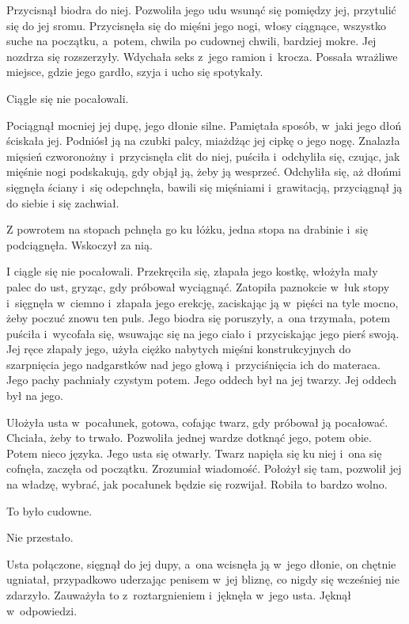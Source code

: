 \documentclass[oneside,polish,11pt,sfheadings]{mwbk}
\begin{document}
Przycisnął biodra do niej. Pozwoliła jego udu wsunąć się pomiędzy jej,
przytulić się do jej sromu. Przycisnęła się do mięśni jego nogi, włosy
ciągnące, wszystko suche na początku, a~potem, chwila po cudownej
chwili, bardziej mokre. Jej nozdrza się rozszerzyły. Wdychała seks z~jego ramion i~krocza. Possała wrażliwe miejsce, gdzie jego gardło, szyja
i ucho się spotykały.

Ciągle się nie pocałowali.

Pociągnął mocniej jej dupę, jego dłonie silne. Pamiętała sposób, w~jaki
jego dłoń ściskała jej. Podniósł ją na czubki palcy, miażdżąc jej cipkę
o jego nogę. Znalazła mięsień czworonożny i~przycisnęła clit do niej,
puściła i~odchyliła się, czując, jak mięśnie nogi podskakują, gdy objął
ją, żeby ją wesprzeć. Odchyliła się, aż dłońmi sięgnęła ściany i~się
odepchnęła, bawili się mięśniami i~grawitacją, przyciągnął ją do siebie
i się zachwiał.

Z powrotem na stopach pchnęła go ku łóżku, jedna stopa na drabinie i~się
podciągnęła. Wskoczył za nią.

I ciągle się nie pocałowali. Przekręciła się, złapała jego kostkę,
włożyła mały palec do ust, gryząc, gdy próbował wyciągnąć. Zatopiła
paznokcie w~łuk stopy i~sięgnęła w~ciemno i~złapała jego erekcję,
zaciskając ją w~pięści na tyle mocno, żeby poczuć znowu ten puls. Jego
biodra się poruszyły, a~ona trzymała, potem puściła i~wycofała się,
wsuwając się na jego ciało i~przyciskając jego pierś swoją. Jej ręce
złapały jego, użyła ciężko nabytych mięśni konstrukcyjnych do
szarpnięcia jego nadgarstków nad jego głową i~przyciśnięcia ich do
materaca. Jego pachy pachniały czystym potem. Jego oddech był na jej
twarzy. Jej oddech był na jego.

Ułożyła usta w~pocałunek, gotowa, cofając twarz, gdy próbował ją
pocałować. Chciała, żeby to trwało. Pozwoliła jednej wardze dotknąć
jego, potem obie. Potem nieco języka. Jego usta się otwarły. Twarz
napięła się ku niej i~ona się cofnęła, zaczęła od początku. Zrozumiał
wiadomość. Położył się tam, pozwolił jej na władzę, wybrać, jak
pocałunek będzie się rozwijał. Robiła to bardzo wolno.

To było cudowne.

Nie przestało.

Usta połączone, sięgnął do jej dupy, a~ona wcisnęła ją w~jego dłonie, on
chętnie ugniatał, przypadkowo uderzając penisem w~jej bliznę, co nigdy
się wcześniej nie zdarzyło. Zauważyła to z~roztargnieniem i~jęknęła w~jego usta. Jęknął w~odpowiedzi.
\end{document}
